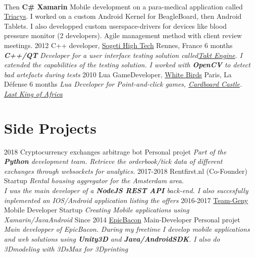 \documentclass{emonides-cv}
\begin{document}
\begin{entrylist}
{{    \\Then \textbf{C\# Xamarin} Mobile development on a para-medical application called \href{http://www.triacys.com/}{Triacys}.
    I worked on a custom Android Kernel for BeagleBoard, then Android Tablets. I also developped custom userspace-drivers for devices like blood pressure monitor
    (2 developers). Agile management method with client review meetings. }}
  \entry
    {2012}
    {C++ developer, \href{https://www.acensi.fr/}{Sogeti High Tech} {\normalfont Rennes, France}}
    {6 months}
    {\emph{\textbf{C++/QT} Developer for a user interface testing solution called\href{https://www.eurocaution.net/}{Takt Engine}.
    I extended the capabilities of the testing solution. I worked with \textbf{OpenCV} to detect bad artefacts during tests }}
  \entry
    {2010}
    {Lua GameDeveloper, \href{https://www.giantbomb.com/white-birds-productions/3010-5637/}{White Birds} {\normalfont Paris, La Défense}}
    {6 months}
    {\emph{Lua Developer for Point-and-click games, \href{https://www.bigfishgames.com/games/6859/cardboard-castle/}{Cardboard Castle}. \href{https://www.wikiwand.com/fr/White_Birds_Productions}{Last King of Africa}}}
\end{entrylist}

\vspace{1.5cm}

\section{Side Projects}
\begin{entrylist}
  \entry
    {2018}
    {Cryptocurrency exchanges arbitrage bot {\normalfont }}
    {Personal projet}
    {\emph{Part of the \textbf{Python} development team. Retrieve the orderbook/tick data of different exchanges through websockets for analytics. }}
  \entry
    {2017-2018}
    {Rentfirst.nl {\normalfont  (Co-Founder)}}
    {Startup}
    {\emph{Rental housing aggregator for the Amsterdam area. \\
    I was the main developer of a \textbf{NodeJS REST API} back-end.
    I also succesfully inplemented an IOS/Android application listing the offers}}
  \entry
    {2016-2017}
    {\href{http://www.teamgeny.com/}{Team-Geny} {\normalfont Mobile Developer}}
    {Startup}
    {\emph{Creating Mobile applications using Xamarin/JavaAndroid}}
  \entry
    {Since 2014}
    {\href{https://play.google.com/store/apps/developer?id=EpicBacon}{EpicBacon} {\normalfont Main-Developer}}
    {Personal projet}
    {\emph{Main developper of EpicBacon. During my freetime I develop mobile applications and web solutions using \textbf{Unity3D} and \textbf{Java/AndroidSDK}.
    I also do 3Dmodeling with 3DsMax for 3Dprinting  }}
\end{entrylist}
\end{document}
